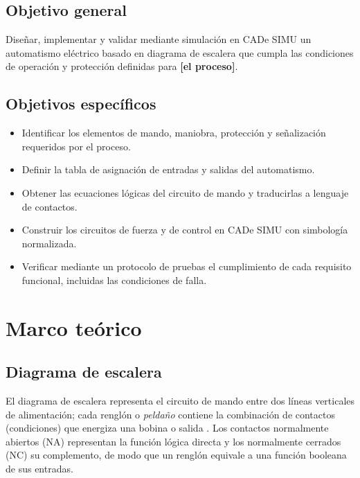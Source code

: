 \documentclass[conference,a4paper,10pt]{IEEEtran}
\begin{document}
\subsection{Objetivo general}
Diseñar, implementar y validar mediante simulación en CADe SIMU un automatismo
eléctrico basado en diagrama de escalera que cumpla las condiciones de
operación y protección definidas para \textbf{[el proceso]}.

\subsection{Objetivos específicos}
\begin{itemize}[leftmargin=1.2em,itemsep=1pt,topsep=2pt]
  \item Identificar los elementos de mando, maniobra, protección y
        señalización requeridos por el proceso.
  \item Definir la tabla de asignación de entradas y salidas del automatismo.
  \item Obtener las ecuaciones lógicas del circuito de mando y traducirlas a
        lenguaje de contactos.
  \item Construir los circuitos de fuerza y de control en CADe SIMU con
        simbología normalizada.
  \item Verificar mediante un protocolo de pruebas el cumplimiento de cada
        requisito funcional, incluidas las condiciones de falla.
\end{itemize}

\section{Marco teórico}\label{sec:marco}

\subsection{Diagrama de escalera}
El diagrama de escalera representa el circuito de mando entre dos líneas
verticales de alimentación; cada renglón o \textit{peldaño} contiene la
combinación de contactos (condiciones) que energiza una bobina o salida
\cite{petruzella}. Los contactos normalmente abiertos (NA) representan la
función lógica directa y los normalmente cerrados (NC) su complemento, de modo
que un renglón equivale a una función booleana de sus entradas.
\end{document}
